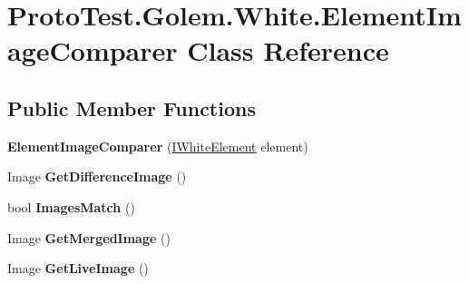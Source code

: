 \hypertarget{class_proto_test_1_1_golem_1_1_white_1_1_element_image_comparer}{\section{Proto\-Test.\-Golem.\-White.\-Element\-Image\-Comparer Class Reference}
\label{class_proto_test_1_1_golem_1_1_white_1_1_element_image_comparer}
}
\subsection*{Public Member Functions}
\begin{DoxyCompactItemize}
\item 
\hypertarget{class_proto_test_1_1_golem_1_1_white_1_1_element_image_comparer_a07ee837e742892734fbc21242eba47d9}{{\bfseries Element\-Image\-Comparer} (\hyperlink{interface_proto_test_1_1_golem_1_1_white_1_1_elements_1_1_i_white_element}{I\-White\-Element} element)}\label{class_proto_test_1_1_golem_1_1_white_1_1_element_image_comparer_a07ee837e742892734fbc21242eba47d9}

\item 
\hypertarget{class_proto_test_1_1_golem_1_1_white_1_1_element_image_comparer_ad1f0ea3636e8cd087dd5123deba93f77}{Image {\bfseries Get\-Difference\-Image} ()}\label{class_proto_test_1_1_golem_1_1_white_1_1_element_image_comparer_ad1f0ea3636e8cd087dd5123deba93f77}

\item 
\hypertarget{class_proto_test_1_1_golem_1_1_white_1_1_element_image_comparer_af11f25785a48c0803e19ba7683cd5b8b}{bool {\bfseries Images\-Match} ()}\label{class_proto_test_1_1_golem_1_1_white_1_1_element_image_comparer_af11f25785a48c0803e19ba7683cd5b8b}

\item 
\hypertarget{class_proto_test_1_1_golem_1_1_white_1_1_element_image_comparer_aad505ce7b29dfc8d462392dcf53cf9d3}{Image {\bfseries Get\-Merged\-Image} ()}\label{class_proto_test_1_1_golem_1_1_white_1_1_element_image_comparer_aad505ce7b29dfc8d462392dcf53cf9d3}

\item 
\hypertarget{class_proto_test_1_1_golem_1_1_white_1_1_element_image_comparer_a33f54d88444e6c0eaec0a9015bb0fb0a}{Image {\bfseries Get\-Live\-Image} ()}\label{class_proto_test_1_1_golem_1_1_white_1_1_element_image_comparer_a33f54d88444e6c0eaec0a9015bb0fb0a}


\end{DoxyCompactItemize}
